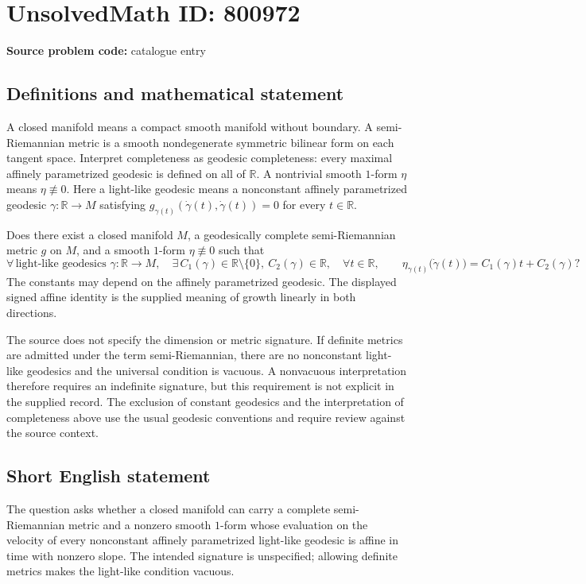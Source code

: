 \documentclass[11pt]{article}
\newcommand{\R}{\mathbb{R}}
\begin{document}
\section*{UnsolvedMath ID: 800972}
\textbf{Source problem code:} catalogue entry
\subsection{Definitions and mathematical statement}
A closed manifold means a compact smooth manifold without boundary. A semi-Riemannian metric is a smooth nondegenerate symmetric bilinear form on each tangent space. Interpret completeness as geodesic completeness: every maximal affinely parametrized geodesic is defined on all of \(\R\). A nontrivial smooth \(1\)-form \(\eta\) means \(\eta\not\equiv 0\). Here a light-like geodesic means a nonconstant affinely parametrized geodesic \(\gamma:\R\to M\) satisfying \(g_{\gamma(t)}(\dot\gamma(t),\dot\gamma(t))=0\) for every \(t\in\R\).

Does there exist a closed manifold \(M\), a geodesically complete semi-Riemannian metric \(g\) on \(M\), and a smooth \(1\)-form \(\eta\not\equiv0\) such that
\[
\forall\,\text{light-like geodesics }\gamma:\R\to M,\quad
\exists\, C_1(\gamma)\in\R\setminus\{0\},\ C_2(\gamma)\in\R,\quad
\forall t\in\R,\qquad
\eta_{\gamma(t)}\bigl(\dot\gamma(t)\bigr)=C_1(\gamma)t+C_2(\gamma)?
\]
The constants may depend on the affinely parametrized geodesic. The displayed signed affine identity is the supplied meaning of growth linearly in both directions.

The source does not specify the dimension or metric signature. If definite metrics are admitted under the term semi-Riemannian, there are no nonconstant light-like geodesics and the universal condition is vacuous. A nonvacuous interpretation therefore requires an indefinite signature, but this requirement is not explicit in the supplied record. The exclusion of constant geodesics and the interpretation of completeness above use the usual geodesic conventions and require review against the source context.
\subsection{Short English statement}
The question asks whether a closed manifold can carry a complete semi-Riemannian metric and a nonzero smooth \(1\)-form whose evaluation on the velocity of every nonconstant affinely parametrized light-like geodesic is affine in time with nonzero slope. The intended signature is unspecified; allowing definite metrics makes the light-like condition vacuous.
\end{document}
